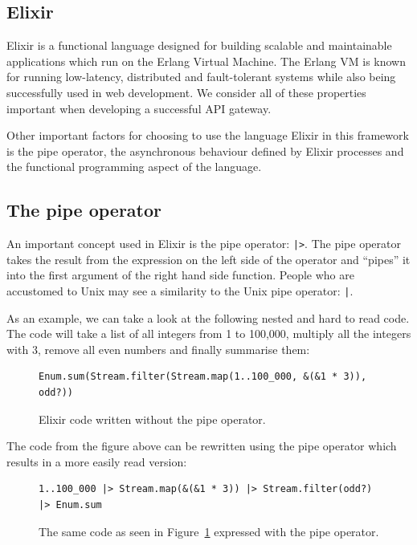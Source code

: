 \documentclass{cslthse-msc}
\begin{document}
\subsection{Elixir}
Elixir is a functional language designed for building scalable and maintainable applications which run on the Erlang Virtual Machine. The Erlang VM is known for running low-latency, distributed and fault-tolerant systems while also being successfully used in web development\cite{elixir}. We consider all of these properties important when developing a successful API gateway.

Other important factors for choosing to use the language Elixir in this framework is the pipe operator, the asynchronous behaviour defined by Elixir processes and the functional programming aspect of the language.

\subsection{The pipe operator}
An important concept used in Elixir is the pipe operator: \lstinline{|>}. The pipe operator takes the result from the expression on the left side of the operator and \enquote{pipes} it into the first argument of the right hand side function. People who are accustomed to Unix may see a similarity to the Unix pipe operator: \lstinline{|}.

\vspace{5mm}

\noindent As an example, we can take a look at the following nested and hard to read code. The code will take a list of all integers from 1 to 100,000, multiply all the integers with 3, remove all even numbers and finally summarise them:

\begin{figure}[H]
  \centering
\begin{lstlisting}[breaklines=true,frame=single]
Enum.sum(Stream.filter(Stream.map(1..100_000, &(&1 * 3)), odd?))
\end{lstlisting}
  \caption{Elixir code written without the pipe operator.}
  \label{fig:no_pipe}
\end{figure}

\noindent The code from the figure above can be rewritten using the pipe operator which results in a more easily read version:

\begin{figure}[H]
  \centering
\begin{lstlisting}[breaklines=true,frame=single]
1..100_000 |> Stream.map(&(&1 * 3)) |> Stream.filter(odd?) |> Enum.sum
\end{lstlisting}
  \caption{The same code as seen in Figure~\ref{fig:no_pipe} expressed with the pipe operator.}
\end{figure}
\end{document}
